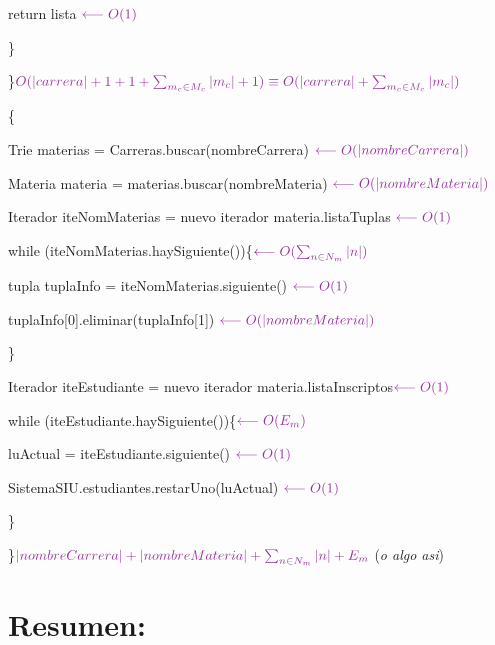 \documentclass[a4paper,10pt]{article}
\begin{document}
    return lista \hfill $\color{Purple}\longleftarrow O(1)$

\}

\noindent\}\hfill $\color{Purple} O(|carrera|+1+1+\sum_{m_c\in M_c}^{} |m_c| +1 )\equiv O(|carrera|+\sum_{m_c\in M_c}^{} |m_c|)$

\salto{\baselineskip}

\{

    Trie materias = Carreras.buscar(nombreCarrera) \hfill $\color{Purple}\longleftarrow O(|nombreCarrera|)$

    Materia materia =  materias.buscar(nombreMateria) \hfill $\color{Purple}\longleftarrow O(|nombreMateria|)$

    Iterador iteNomMaterias = nuevo iterador materia.listaTuplas \hfill $\color{Purple}\longleftarrow O(1)$
    
    while (iteNomMaterias.haySiguiente())\{\hfill $\color{Purple}\longleftarrow O(\sum_{n\in N_m}^{} |n|)$

    \hspace*{1.5em} tupla tuplaInfo = iteNomMaterias.siguiente() \hfill $\color{Purple}\longleftarrow O(1)$

    \hspace*{1.5em} tuplaInfo[0].eliminar(tuplaInfo[1]) \hfill $\color{Purple}\longleftarrow O(|nombreMateria|)$

    \}

    Iterador iteEstudiante = nuevo iterador materia.listaInscriptos\hfill $\color{Purple}\longleftarrow O(1)$

    while (iteEstudiante.haySiguiente())\{\hfill $\color{Purple}\longleftarrow O(E_m)$

    \hspace{1.5em} luActual = iteEstudiante.siguiente() \hfill $\color{Purple}\longleftarrow O(1)$

    \hspace*{1.5em} SistemaSIU.estudiantes.restarUno(luActual) \hfill $\color{Purple}\longleftarrow O(1)$
    
    \}

\}\hfill {$\color{Purple} |nombreCarrera|+|nombreMateria|+\sum_{n\in N_m}^{} |n| + E_m $ \color{Purple}(\emph{o algo asi})}
\pagebreak
\section*{Resumen:}
\end{document}
